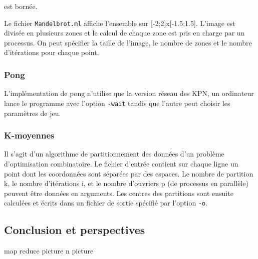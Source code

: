 \documentclass[]{scrartcl}
\begin{document}
est bornée.

Le fichier \lstinline!Mandelbrot.ml! affiche l'ensemble sur
{[}-2;2{]}x{[}-1.5;1.5{]}. L'image est divisée en plusieurs zones et le
calcul de chaque zone est pris en charge par un processus. On peut
spécifier la taille de l'image, le nombre de zones et le nombre
d'itérations pour chaque point.

\subsubsection{Pong}\label{pong}

L'implémentation de pong n'utilise que la version réseau des KPN, un
ordinateur lance le programme avec l'option \lstinline!-wait! tandis que
l'autre peut choisir les paramètres de jeu.

\subsubsection{K-moyennes}\label{k-moyennes}

Il s'agit d'un algorithme de partitionnement des données d'un problème
d'optimisation combinatoire. Le fichier d'entrée contient sur chaque
ligne un point dont les coordonnées sont séparées par des espaces. Le
nombre de partition k, le nombre d'itérations i, et le nombre d'ouvriers
p (de processus en parallèle) peuvent être données en arguments. Les
centres des partitions sont ensuite calculées et écrits dans un fichier
de sortie spécifié par l'option \lstinline!-o!.

\subsection{Conclusion et
perspectives}\label{conclusion-et-perspectives}

map reduce picture n picture
\end{document}
